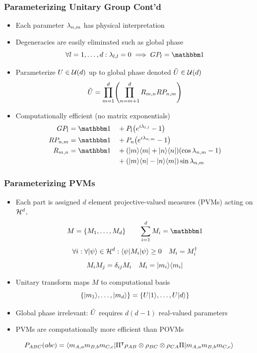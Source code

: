 \documentclass[
    hyperref={bookmarks=false},%
    xcolor={dvipsnames},
]{beamer}
\renewcommand{\term}[1]{\textcolor{Mahogany}{#1}}
\begin{document}
\begin{frame}
    \frametitle{Parameterizing Unitary Group Cont'd}
    \begin{itemize}
        \item Each parameter $\lambda_{n,m}$ has physical interpretation
        \item Degeneracies are easily eliminated such as global phase
        \[ \forall l = 1, \ldots, d : \la_{l,l} = 0 \implies GP_{l} = \ident \]
        \item Parameterize $U \in \s{U}\br{d}$ up to global phase denoted $\ti{U} \in \s{U}\br{d}$
        \[ \ti{U} = \prod_{m=1}^{d} \br{\prod_{n={m+1}}^{d} R_{m,n} RP_{n,m}} \]
        \item Computationally efficient (no matrix exponentials)
        \begin{alignat*}{2}
            GP_l &= \ident &&+ P_l \br{e^{i\la_{l,l}} - 1} \\
            RP_{n,m} &= \ident &&+ P_n \br{e^{i\la_{n,m}} - 1} \\
            R_{m,n} &= \ident &&+ \br{\ket{m}\bra{m} + \ket{n}\bra{n}} \br{\cos\lambda_{n,m} - 1} \\
            & &&+ \br{\ket{m}\bra{n} - \ket{n}\bra{m}} \sin\lambda_{n,m} \\
        \end{alignat*}
    \end{itemize}
\end{frame}

\begin{frame}
    \frametitle{Parameterizing PVMs}
    \begin{itemize}
        \item Each part is assigned $d$ element \term{projective-valued measures (PVMs)} acting on $\mathcal{H}^d$,
        \[ M = \bc{M_1, \ldots, M_d} \qquad \sum_{i=1}^{d} M_{i} = \ident \]
        \[ \forall i: \forall \ket{\psi} \in \Hilb^d : \bra{\psi} M_i \ket{\psi} \geq 0 \quad M_i = M_i^{\dagger} \]
        \[ M_{i}M_{j} = \de_{ij} M_{i} \quad M_{i} = \ket{m_{i}}\bra{m_{i}} \]
        \item Unitary transform maps $M$ to computational basis
        \[ \bc{\ket{m_{1}}, \ldots, \ket{m_{d}}} = \bc{U \ket{1}, \ldots, U \ket{d}} \]
        \item Global phase irrelevant: $\tilde{U}\hspace{0pt}$ requires $d(d - 1)$ real-valued parameters
        \item PVMs are computationally more efficient than POVMs
    \end{itemize}
    \[ \prob[ABC]\br{abc} = \bra{m_{A,a}m_{B,b}m_{C,c}}{\netperm^\intercal \rho_{AB}\otimes\rho_{BC}\otimes\rho_{CA} \netperm}\ket{m_{A,a}m_{B,b}m_{C,c}} \]
\end{frame}
\end{document}
